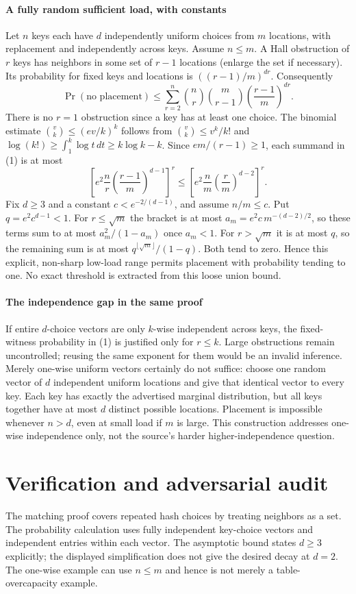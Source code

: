 \documentclass[11pt]{article}
\begin{document}
\paragraph{A fully random sufficient load, with constants}
Let $n$ keys each have $d$ independently uniform choices from $m$ locations, with replacement and independently across keys. Assume $n\leq m$. A Hall obstruction of $r$ keys has neighbors in some set of $r-1$ locations (enlarge the set if necessary). Its probability for fixed keys and locations is $((r-1)/m)^{dr}$. Consequently
\[
 \Pr(\text{no placement})\leq\sum_{r=2}^n
 {n\choose r}{m\choose r-1}\left(\frac{r-1}{m}\right)^{dr}.
 \tag{1}
\]
There is no $r=1$ obstruction since a key has at least one choice. The binomial estimate ${v\choose k}\leq(ev/k)^k$ follows from ${v\choose k}\leq v^k/k!$ and $\log(k!)\geq\int_1^k\log t\,dt\geq k\log k-k$. Since $em/(r-1)\geq1$, each summand in (1) is at most
\[
 \left[e^2\frac nr\left(\frac{r-1}{m}\right)^{d-1}\right]^r
 \leq\left[e^2\frac nm\left(\frac rm\right)^{d-2}\right]^r.
\]
Fix $d\geq3$ and a constant $c<e^{-2/(d-1)}$, and assume $n/m\leq c$. Put $q=e^2c^{d-1}<1$. For $r\leq\sqrt m$ the bracket is at most $a_m=e^2c\,m^{-(d-2)/2}$, so these terms sum to at most $a_m^2/(1-a_m)$ once $a_m<1$. For $r>\sqrt m$ it is at most $q$, so the remaining sum is at most $q^{\lfloor\sqrt m\rfloor}/(1-q)$. Both tend to zero. Hence this explicit, non-sharp low-load range permits placement with probability tending to one. No exact threshold is extracted from this loose union bound.

\paragraph{The independence gap in the same proof}
If entire $d$-choice vectors are only $k$-wise independent across keys, the fixed-witness probability in (1) is justified only for $r\leq k$. Large obstructions remain uncontrolled; reusing the same exponent for them would be an invalid inference. Merely one-wise uniform vectors certainly do not suffice: choose one random vector of $d$ independent uniform locations and give that identical vector to every key. Each key has exactly the advertised marginal distribution, but all keys together have at most $d$ distinct possible locations. Placement is impossible whenever $n>d$, even at small load if $m$ is large. This construction addresses one-wise independence only, not the source's harder higher-independence question.

\section{Verification and adversarial audit}
The matching proof covers repeated hash choices by treating neighbors as a set. The probability calculation uses fully independent key-choice vectors and independent entries within each vector. The asymptotic bound states $d\geq3$ explicitly; the displayed simplification does not give the desired decay at $d=2$. The one-wise example can use $n\leq m$ and hence is not merely a table-overcapacity example.
\end{document}
